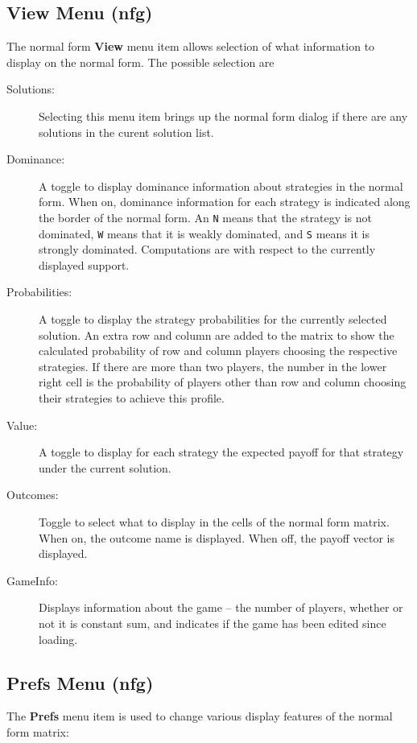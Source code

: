 \subsection{View Menu (nfg)}\label{nfinspectsec}
The normal form {\bf View} menu item allows selection of what
information to display on the normal form.  The possible selection are 

\begin{description}
\item[Solutions:]  Selecting this menu item brings up the normal form 
 dialog if
there are any solutions in the curent solution list.
\item[Dominance:]  A toggle to display dominance information about
strategies in the normal form. When on, dominance information for each
strategy is indicated along the border of the normal form.  An {\tt N} 
means that the strategy is not dominated, {\tt W} means that it is
weakly dominated, and {\tt S} means it is strongly
dominated.  Computations are with respect to the currently displayed
support.
\item[Probabilities:]  A toggle to display the strategy probabilities
for the currently selected solution.  An extra row and column are
added to the matrix to show the calculated probability of row and
column players choosing the respective strategies.  If there are more
than two players, the number in the lower right cell is the
probability of players other than row and column choosing their
strategies to achieve this profile.
\item[Value:]  A toggle to display for each strategy the expected 
payoff for that strategy under the current solution.  
\item[Outcomes:] Toggle to select what to display in the cells of the normal form matrix.  When on, the outcome name is displayed.  When off, the payoff vector is displayed.  
\item[GameInfo:] Displays information about the game -- the number
of players, whether or not it is constant sum, and indicates if the
game has been edited since loading.
\end{description}

\subsection{Prefs Menu (nfg)}
The {\bf Prefs} menu item is used to change various display features
of the normal form matrix:  


